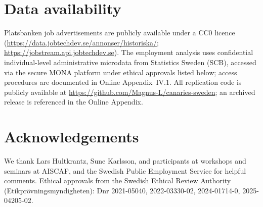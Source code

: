 \documentclass[preprint,12pt,authoryear]{elsarticle}
\begin{document}
\section*{Data availability}
{\sloppy
Platsbanken job advertisements are publicly available under a CC0 licence (\url{https://data.jobtechdev.se/annonser/historiska/}; \url{https://jobstream.api.jobtechdev.se}). The employment analysis uses confidential individual-level administrative microdata from Statistics Sweden (SCB), accessed via the secure MONA platform under ethical approvals listed below; access procedures are documented in Online Appendix~IV.1. All replication code is publicly available at \url{https://github.com/Magnus-L/canaries-sweden}; an archived release is referenced in the Online Appendix.\par}

\section*{Acknowledgements}
We thank Lars Hultkrantz, Sune Karlsson, and participants at workshops and seminars at AISCAF, and the Swedish Public Employment Service for helpful comments. Ethical approvals from the Swedish Ethical Review Authority (Etikpr\"ovningsmyndigheten): Dnr 2021-05040, 2022-03330-02, 2024-01714-0, 2025-04205-02.



\end{document}
